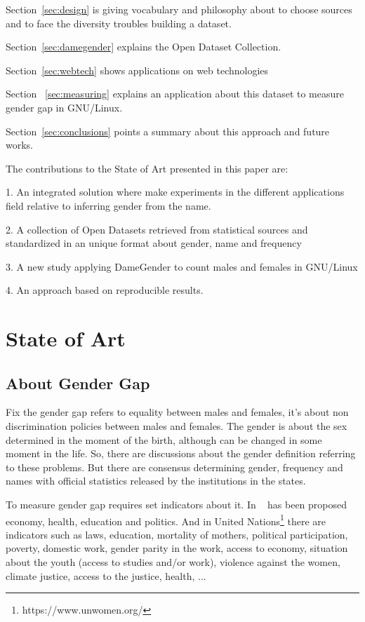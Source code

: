 \documentclass[a4paper]{article}
\begin{document}
Section~\ref{sec:design} is giving vocabulary and philosophy about to
choose sources and to face the diversity troubles building a dataset.

Section~\ref{sec:damegender} explains the Open Dataset Collection.

Section~\ref{sec:webtech} shows applications on web technologies

Section ~\ref{sec:measuring} explains an application about this
dataset to measure gender gap in GNU/Linux.

Section~\ref{sec:conclusions} points a summary about this approach and
future works.

The contributions to the State of Art presented in this paper are:

1. An integrated solution where make experiments in the different
applications field relative to inferring gender from the name.

2. A collection of Open Datasets retrieved from statistical sources
and standardized in an unique format about gender, name and frequency

3. A new study applying DameGender to count males and females in
GNU/Linux

4. An approach based on reproducible results.


\section{State of Art}
\label{sec:stateofart}

\subsection{About Gender Gap}

Fix the gender gap refers to equality between males and females, it's
about non discrimination policies between males and females. The
gender is about the sex determined in the moment of the birth,
although can be changed in some moment in the life. So, there are
discussions about the gender definition referring to these
problems. But there are consensus determining gender, frequency and
names with official statistics released by the institutions in the
states.

To measure gender gap requires set indicators about it. In
~\cite{world2021global} has been proposed economy, health, education
and politics. And in United Nations\footnote{https://www.unwomen.org/}
there are indicators such as laws, education, mortality of mothers,
political participation, poverty, domestic work, gender parity in
the work, access to economy, situation about the youth (access to
studies and/or work), violence against the women, climate justice,
access to the justice, health, ...
\end{document}
